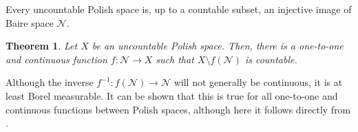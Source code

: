 \documentclass[12pt]{article}
\newtheorem*{theorem*}{Theorem}
\begin{document}
Every uncountable Polish space is, up to a countable subset, an injective image of Baire space $\mathcal{N}$.

\begin{theorem*}
Let $X$ be an uncountable Polish space. Then, there is a one-to-one and continuous function $f\colon\mathcal{N}\rightarrow X$ such that $X\setminus f(\mathcal{N})$ is countable.
\end{theorem*}

Although the inverse $f^{-1}\colon f(\mathcal{N})\rightarrow \mathcal{N}$ will not generally be continuous, it is at least Borel measurable. It can be shown that this is true for all one-to-one and continuous functions between Polish spaces, although here it follows directly from .

\end{document}
